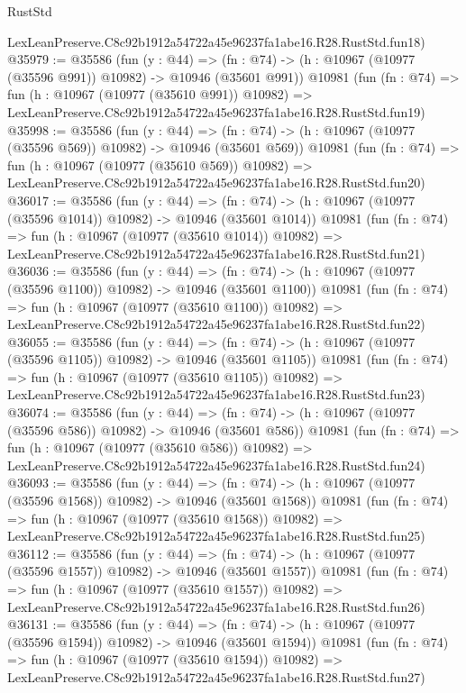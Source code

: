 \begin{lexlean}{RustStd}
\begin{coremodule}
    LexLeanPreserve.C8c92b1912a54722a45e96237fa1abe16.R28.RustStd.fun18)
@35979 := @35586
    (fun (y : @44) =>
    (fn : @74) -> (h : @10967 (@10977 (@35596 @991)) @10982) -> @10946 (@35601 @991))
    @10981
    (fun (fn : @74) =>
    fun (h : @10967 (@10977 (@35610 @991)) @10982) =>
    LexLeanPreserve.C8c92b1912a54722a45e96237fa1abe16.R28.RustStd.fun19)
@35998 := @35586
    (fun (y : @44) =>
    (fn : @74) -> (h : @10967 (@10977 (@35596 @569)) @10982) -> @10946 (@35601 @569))
    @10981
    (fun (fn : @74) =>
    fun (h : @10967 (@10977 (@35610 @569)) @10982) =>
    LexLeanPreserve.C8c92b1912a54722a45e96237fa1abe16.R28.RustStd.fun20)
@36017 := @35586
    (fun (y : @44) =>
    (fn : @74) -> (h : @10967 (@10977 (@35596 @1014)) @10982) -> @10946 (@35601 @1014))
    @10981
    (fun (fn : @74) =>
    fun (h : @10967 (@10977 (@35610 @1014)) @10982) =>
    LexLeanPreserve.C8c92b1912a54722a45e96237fa1abe16.R28.RustStd.fun21)
@36036 := @35586
    (fun (y : @44) =>
    (fn : @74) -> (h : @10967 (@10977 (@35596 @1100)) @10982) -> @10946 (@35601 @1100))
    @10981
    (fun (fn : @74) =>
    fun (h : @10967 (@10977 (@35610 @1100)) @10982) =>
    LexLeanPreserve.C8c92b1912a54722a45e96237fa1abe16.R28.RustStd.fun22)
@36055 := @35586
    (fun (y : @44) =>
    (fn : @74) -> (h : @10967 (@10977 (@35596 @1105)) @10982) -> @10946 (@35601 @1105))
    @10981
    (fun (fn : @74) =>
    fun (h : @10967 (@10977 (@35610 @1105)) @10982) =>
    LexLeanPreserve.C8c92b1912a54722a45e96237fa1abe16.R28.RustStd.fun23)
@36074 := @35586
    (fun (y : @44) =>
    (fn : @74) -> (h : @10967 (@10977 (@35596 @586)) @10982) -> @10946 (@35601 @586))
    @10981
    (fun (fn : @74) =>
    fun (h : @10967 (@10977 (@35610 @586)) @10982) =>
    LexLeanPreserve.C8c92b1912a54722a45e96237fa1abe16.R28.RustStd.fun24)
@36093 := @35586
    (fun (y : @44) =>
    (fn : @74) -> (h : @10967 (@10977 (@35596 @1568)) @10982) -> @10946 (@35601 @1568))
    @10981
    (fun (fn : @74) =>
    fun (h : @10967 (@10977 (@35610 @1568)) @10982) =>
    LexLeanPreserve.C8c92b1912a54722a45e96237fa1abe16.R28.RustStd.fun25)
@36112 := @35586
    (fun (y : @44) =>
    (fn : @74) -> (h : @10967 (@10977 (@35596 @1557)) @10982) -> @10946 (@35601 @1557))
    @10981
    (fun (fn : @74) =>
    fun (h : @10967 (@10977 (@35610 @1557)) @10982) =>
    LexLeanPreserve.C8c92b1912a54722a45e96237fa1abe16.R28.RustStd.fun26)
@36131 := @35586
    (fun (y : @44) =>
    (fn : @74) -> (h : @10967 (@10977 (@35596 @1594)) @10982) -> @10946 (@35601 @1594))
    @10981
    (fun (fn : @74) =>
    fun (h : @10967 (@10977 (@35610 @1594)) @10982) =>
    LexLeanPreserve.C8c92b1912a54722a45e96237fa1abe16.R28.RustStd.fun27)

\end{coremodule}
\end{lexlean}
